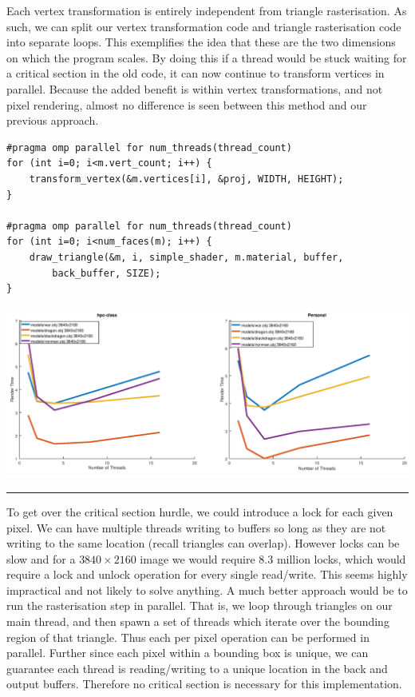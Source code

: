 \documentclass[12pt]{article}
\begin{document}
Each vertex transformation is entirely independent from triangle rasterisation. As such, we can split
our vertex transformation code and triangle rasterisation code into separate loops. 
This exemplifies the idea that these are the two dimensions on which the program scales. By doing
this if a thread would be stuck waiting for a critical section in the old code, it can now continue
to transform vertices in parallel. Because the added benefit is within vertex transformations,
and not pixel rendering, almost no difference is seen between this method and our previous
approach.

\begin{verbatim}
#pragma omp parallel for num_threads(thread_count)
for (int i=0; i<m.vert_count; i++) {
	transform_vertex(&m.vertices[i], &proj, WIDTH, HEIGHT);
}

#pragma omp parallel for num_threads(thread_count)
for (int i=0; i<num_faces(m); i++) {
	draw_triangle(&m, i, simple_shader, m.material, buffer, 
		back_buffer, SIZE);
}
\end{verbatim}

\begin{center}
	\includegraphics[width=\textwidth]{method2.png}
\end{center}
\textcolor[RGB]{200,200,200}{\rule{\textwidth}{0.75pt}}\bigbreak

To get over the critical section hurdle, we could introduce a lock 
for each given pixel. We can have multiple threads writing to buffers
so long as they are not writing to the same location (recall triangles can overlap).
However locks can be slow and for a $3840\times2160$ image we would require 8.3 million
locks, which would require a lock and unlock operation for every single read/write. This seems highly
impractical and not likely to solve anything.
\bigbreak
A much better approach would be to run the rasterisation step in parallel. That is,
we loop through triangles on our main thread, and then spawn a set of threads which 
iterate over the bounding region of that triangle. Thus each per pixel operation can be
performed in parallel. Further since each pixel within a bounding box is unique, we can 
guarantee each thread is reading/writing to a unique location in the back and output buffers.
Therefore no critical section is necessary for this implementation.
\end{document}
